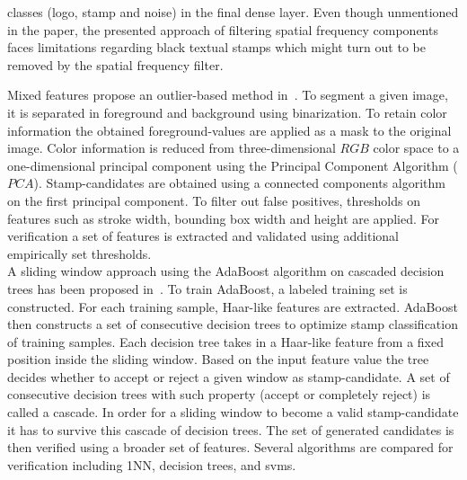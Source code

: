 \begin{description}
\begin{enumerate*}[label={\alph*)},font={\color{red!50!black}\bfseries}]
        classes (logo, stamp and noise) in the final \gls{dense layer}. Even 
        though unmentioned in the paper, the presented approach of filtering 
        spatial frequency components faces limitations regarding black textual 
        stamps which might turn out to be removed by the spatial frequency 
        filter.\\
        \item [Mixed features]
        \citeauthor*{Dey.2015121620151219} propose an outlier-based
        method in~\cite{Dey.2015121620151219}. To segment a given image,
        it is separated in foreground and background using binarization. To
        retain color information the obtained foreground-values are applied as
        a mask to the original image. Color information is reduced from
        three-dimensional \(RGB\) color space to a one-dimensional principal
        component using the Principal Component Algorithm (\(PCA\)).
        Stamp-candidates are obtained using a connected components algorithm on
        the first principal component. To filter out false positives,
        thresholds on features such as stroke width, bounding box width and
        height are applied. For verification a set of features is extracted and
        validated using additional empirically set thresholds.\\

        A sliding window approach using the AdaBoost algorithm on cascaded
        decision trees has been proposed in~\cite{Forczmanski.2016}. To train 
        AdaBoost, a labeled training set is constructed. For each training 
        sample, Haar-like features are extracted. AdaBoost then constructs a 
        set of consecutive decision trees to optimize stamp classification of 
        training samples. Each decision tree takes in a Haar-like feature from 
        a fixed position inside the sliding window. Based on the input feature 
        value the tree decides whether to accept or reject a given window as 
        stamp-candidate. A set of consecutive decision trees with such property 
        (accept or completely reject) is called a cascade. In order for a 
        sliding window to become a valid stamp-candidate it has to survive this 
        cascade of decision trees. The set of generated candidates is then 
        verified using a broader set of features. Several algorithms are 
        compared for verification including 1NN, decision trees, and \glspl{svm}.\\


\end{enumerate*}
\end{description}
